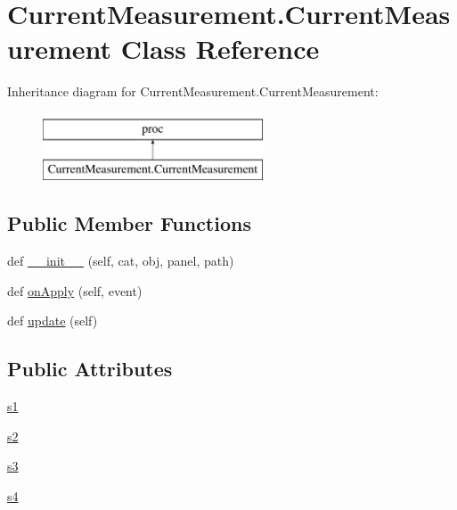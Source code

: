 \hypertarget{classCurrentMeasurement_1_1CurrentMeasurement}{}\section{Current\+Measurement.\+Current\+Measurement Class Reference}
\label{classCurrentMeasurement_1_1CurrentMeasurement}
Inheritance diagram for Current\+Measurement.\+Current\+Measurement\+:\begin{figure}[H]
\begin{center}
\leavevmode
\includegraphics[height=2.000000cm]{classCurrentMeasurement_1_1CurrentMeasurement}
\end{center}
\end{figure}
\subsection*{Public Member Functions}
\begin{DoxyCompactItemize}
\item 
def \hyperlink{classCurrentMeasurement_1_1CurrentMeasurement_a6c638933aeb8a6ab17b3ff69823d259e}{\+\_\+\+\_\+init\+\_\+\+\_\+} (self, cat, obj, panel, path)
\item 
def \hyperlink{classCurrentMeasurement_1_1CurrentMeasurement_a25af769de641fb09274e8ac719114476}{on\+Apply} (self, event)
\item 
def \hyperlink{classCurrentMeasurement_1_1CurrentMeasurement_a8c8e77e7819a059bcb6eafbfe05cf34f}{update} (self)
\end{DoxyCompactItemize}
\subsection*{Public Attributes}
\begin{DoxyCompactItemize}
\item 
\hyperlink{classCurrentMeasurement_1_1CurrentMeasurement_a76a2cb79c02b94eb57e3f177a5e82732}{s1}
\item 
\hyperlink{classCurrentMeasurement_1_1CurrentMeasurement_a200fb06a147bd5e386a4da95e84c2fe8}{s2}
\item 
\hyperlink{classCurrentMeasurement_1_1CurrentMeasurement_a6700e6d3ab7fe26783abd79560b64e64}{s3}
\item 
\hyperlink{classCurrentMeasurement_1_1CurrentMeasurement_a809a02c49dce0fd059eadbd06740be0f}{s4}
\end{DoxyCompactItemize}


